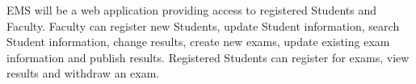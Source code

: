 EMS will be a web application providing access to registered Students and Faculty. 
Faculty can register new Students, update Student information, search Student information, change results, create new exams, update existing exam information and publish results. Registered Students can register for exams, view results and withdraw an exam.
